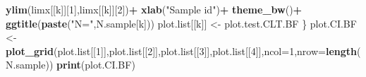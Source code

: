 \documentclass[]{book}
\newenvironment{Shaded}{\begin{snugshade}}{\end{snugshade}}
\newcommand{\DataTypeTok}[1]{\textcolor[rgb]{0.13,0.29,0.53}{#1}}
\newcommand{\DecValTok}[1]{\textcolor[rgb]{0.00,0.00,0.81}{#1}}
\newcommand{\KeywordTok}[1]{\textcolor[rgb]{0.13,0.29,0.53}{\textbf{#1}}}
\newcommand{\NormalTok}[1]{#1}
\newcommand{\OperatorTok}[1]{\textcolor[rgb]{0.81,0.36,0.00}{\textbf{#1}}}
\newcommand{\StringTok}[1]{\textcolor[rgb]{0.31,0.60,0.02}{#1}}
\theoremstyle{definition}
\theoremstyle{definition}
\theoremstyle{definition}
\theoremstyle{remark}
\begin{document}
\begin{Shaded}
\begin{Highlighting}[]
\StringTok{      }\KeywordTok{ylim}\NormalTok{(limx[[k]][}\DecValTok{1}\NormalTok{],limx[[k]][}\DecValTok{2}\NormalTok{])}\OperatorTok{+}
\StringTok{      }\KeywordTok{xlab}\NormalTok{(}\StringTok{"Sample id"}\NormalTok{)}\OperatorTok{+}
\StringTok{      }\KeywordTok{theme_bw}\NormalTok{()}\OperatorTok{+}
\StringTok{      }\KeywordTok{ggtitle}\NormalTok{(}\KeywordTok{paste}\NormalTok{(}\StringTok{"N="}\NormalTok{,N.sample[k]))}
\NormalTok{  plot.list[[k]] <-}\StringTok{ }\NormalTok{plot.test.CLT.BF}
\NormalTok{\}}
\NormalTok{plot.CI.BF <-}\StringTok{ }\KeywordTok{plot_grid}\NormalTok{(plot.list[[}\DecValTok{1}\NormalTok{]],plot.list[[}\DecValTok{2}\NormalTok{]],plot.list[[}\DecValTok{3}\NormalTok{]],plot.list[[}\DecValTok{4}\NormalTok{]],}\DataTypeTok{ncol=}\DecValTok{1}\NormalTok{,}\DataTypeTok{nrow=}\KeywordTok{length}\NormalTok{(N.sample))}
\KeywordTok{print}\NormalTok{(plot.CI.BF)}


\end{Highlighting}
\end{Shaded}
\end{document}
